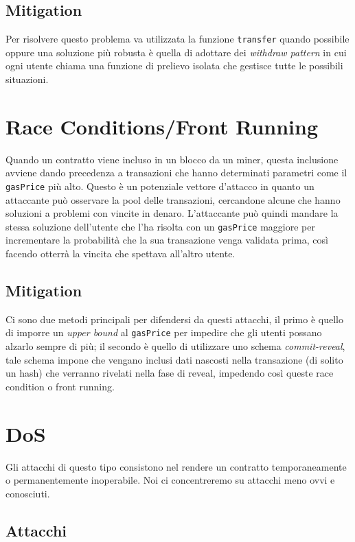\subsection{Mitigation}

Per risolvere questo problema va utilizzata la funzione \verb|transfer|
quando possibile oppure una soluzione più robusta è quella di adottare dei
\textit{withdraw pattern} in cui ogni utente chiama una funzione di prelievo
isolata che gestisce tutte le possibili situazioni.

\section{Race Conditions/Front Running}

Quando un contratto viene incluso in un blocco da un miner,
questa inclusione avviene dando precedenza a transazioni che hanno determinati
parametri come il \verb|gasPrice| più alto.
Questo è un potenziale vettore d'attacco in quanto un attaccante può osservare
la pool delle transazioni, cercandone alcune che hanno soluzioni a problemi con
vincite in denaro. L'attaccante può quindi mandare la stessa soluzione dell'utente
che l'ha risolta con un \verb|gasPrice| maggiore per incrementare la probabilità
che la sua transazione venga validata prima, così facendo otterrà la vincita
che spettava all'altro utente.

\subsection{Mitigation}

Ci sono due metodi principali per difendersi da questi attacchi,
il primo è quello di imporre un \textit{upper bound} al \verb|gasPrice|
per impedire che gli utenti possano alzarlo sempre di più;
il secondo è quello di utilizzare uno schema \textit{commit-reveal},
tale schema impone che vengano inclusi dati nascosti nella transazione
(di solito un hash) che verranno rivelati nella fase di reveal,
impedendo così queste race condition o front running.

\section{DoS}

Gli attacchi di questo tipo consistono nel rendere un contratto temporaneamente
o permanentemente inoperabile.
Noi ci concentreremo su attacchi meno ovvi e conosciuti.

\subsection{Attacchi}

